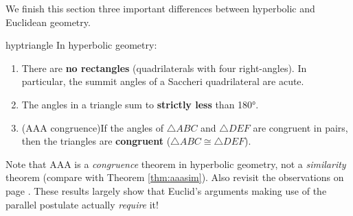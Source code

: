 \goodbreak



We finish this section three important differences between hyperbolic and Euclidean geometry.

\begin{thm}{}{hyptriangle}
	In hyperbolic geometry:
	\begin{enumerate}\itemsep0pt
	  \item There are \textbf{no rectangles} (quadrilaterals with four right-angles). In particular, the summit angles of a Saccheri quadrilateral are acute.
	  \item The angles in a triangle sum to \textbf{strictly less} than \ang{180}.
	  \item (AAA congruence)\lstsp If the angles of $\triangle ABC$ and $\triangle DEF$ are congruent in pairs, then the triangles are \textbf{congruent} ($\triangle ABC\cong\triangle DEF$).
	\end{enumerate}
\end{thm}

Note that AAA is a \emph{congruence} theorem in hyperbolic geometry, not a \emph{similarity} theorem (compare with Theorem \ref{thm:aaasim}). Also revisit the observations on page \pageref{pg:absolute}. These results largely show that Euclid's arguments making use of the parallel postulate actually \emph{require} it! 


